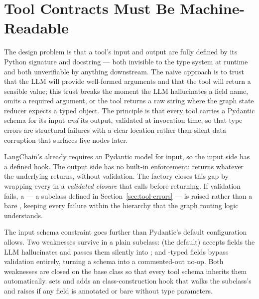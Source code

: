 \section{Tool Contracts Must Be Machine-Readable}
\label{sec:tool-contracts}

The design problem is that a tool's input and output are fully defined by
its Python signature and docstring --- both invisible to the type system at
runtime and both unverifiable by anything downstream. The naive approach is
to trust that the LLM will provide well-formed arguments and that the tool
will return a sensible value; this trust breaks the moment the LLM
hallucinates a field name, omits a required argument, or the tool returns a
raw string where the graph state reducer expects a typed object. The
principle is that every tool carries a Pydantic schema for its input
\emph{and} its output, validated at invocation time, so that type errors
are structural failures with a clear location rather than silent data
corruption that surfaces five nodes later.

LangChain's  already requires an 
Pydantic model for input, so the input side has a defined hook. The output
side has no built-in enforcement:  returns
whatever the underlying  returns, without validation. The
 factory closes this gap by wrapping every
 in a \emph{validated closure} that calls
 before returning. If
validation fails, a  --- a 
subclass defined in Section~\ref{sec:tool-errors} --- is raised rather than
a bare , keeping every failure within the
 hierarchy that the graph routing logic understands.

The input schema constraint goes further than Pydantic's default
configuration allows. Two weaknesses survive in a plain 
subclass:  (the default) accepts fields the LLM
hallucinates and passes them silently into ; and -typed
fields bypass validation entirely, turning a schema into a commented-out
no-op. Both weaknesses are closed on the base class so that every tool
schema inherits them automatically.  sets
 and adds an
 class-construction hook that walks the
subclass's  and raises  if any field
is annotated  or bare  without type parameters.

